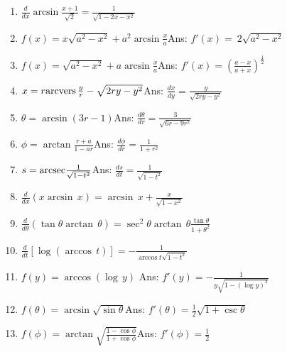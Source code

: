 \begin{enumerate}
\item
$\frac{d}{dx} \arcsin \frac{x + 1}{\sqrt{2}} = \frac{1}{\sqrt{1 - 2x - x^2}}$

\item
$f(x) = x\sqrt{a^2 - x^2} + a^2 \arcsin \frac{x}{a}$\qquad\qquad\qquad\qquad\qquad Ans: 
$ f'(x) =\ 2\sqrt{a^2 - x^2}$

\item
$f(x) = \sqrt{a^2 - x^2} + a \arcsin \frac{x}{a}$\qquad\qquad\qquad\qquad\qquad Ans: 
$f'(x) 	= \left ( \frac{a - x}{a + x} \right )^{\frac{1}{2}}$

\item
$x = r {\rm arcvers}\, \frac{y}{r} - \sqrt{2ry - y^2}$\qquad\qquad\qquad\qquad\qquad\qquad Ans: 
$\frac{dx}{dy} 	= \frac{y}{\sqrt{2ry - y^2}}$

\item
$\theta = \arcsin (3r - 1)$\qquad\qquad\qquad\qquad\qquad\qquad Ans:  	
$\frac{d\theta}{dr} 	= \frac{3}{\sqrt{6r - 9r^2}}$

\item
$\phi = \arctan \frac{r + a}{1 - ar}$\qquad\qquad\qquad\qquad\qquad\qquad Ans: 
$\frac{d\phi}{dr} 	= \frac{1}{1 + r^2}$

\item
$s = {\rm arcsec} \frac{1}{\sqrt{1 - t^2}}$\qquad\qquad\qquad\qquad\qquad\qquad Ans:  
$\frac{ds}{dt} =	\frac{1}{\sqrt{1 - t^2}}$

\item
$\frac{d}{dx} ( x \arcsin\, x) = \arcsin\, x + \frac{x}{\sqrt{1 - x^2}}$

\item
$\frac{d}{d\theta} (\tan \theta \arctan\, \theta) 
= \sec^2 \theta \arctan\, \theta \frac{\tan \theta}{1 + \theta^2}$

\item
$\frac{d}{dt}[\log (\arccos\, t)] = -\frac{1}{\arccos t \sqrt{1 - t^2}}$

\item
$f(y) = \arccos (\log\, y)$ \qquad\qquad\qquad\qquad\qquad\qquad Ans:  	
$f'(y) 	= -\frac{1}{y\sqrt{1 - (\log y)^2}}$

\item
$f(\theta) = \arcsin \sqrt{\sin \theta}$\qquad\qquad\qquad\qquad\qquad\qquad Ans: 
$f'(\theta) 	= \frac{1}{2} \sqrt{1 + \csc \theta}$

\item
$f(\phi) = \arctan \sqrt{\frac{1 - \cos \phi}{1 + \cos \phi}}$\qquad\qquad\qquad\qquad\qquad\qquad Ans:  
$f'(\phi) 	= \frac{1}{2}$


\end{enumerate}
